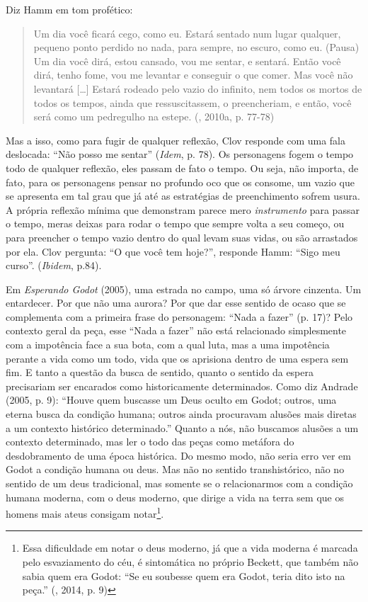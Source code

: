 {Diz Hamm em tom profético:

\begin{quote}
Um dia você ficará cego, como eu. Estará sentado num lugar qualquer,
pequeno ponto perdido no nada, para sempre, no escuro, como eu. (Pausa)
Um dia você dirá, estou cansado, vou me sentar, e sentará. Então você
dirá, tenho fome, vou me levantar e conseguir o que comer. Mas você não
levantará [\ldots{}] Estará rodeado pelo vazio do infinito, nem
todos os mortos de todos os tempos, ainda que ressuscitassem, o
preencheriam, e então, você será como um pedregulho na estepe. (,
2010a, p. 77-78)
\end{quote}

Mas a isso, como para fugir de qualquer reflexão, Clov responde com uma
fala deslocada: ``Não posso me sentar'' (\emph{Idem}, p. 78). Os
personagens fogem o tempo todo de qualquer reflexão, eles passam de fato
o tempo. Ou seja, não importa, de fato, para os personagens pensar no
profundo oco que os consome, um vazio que se apresenta em tal grau que
já até as estratégias de preenchimento sofrem usura. A própria reflexão
mínima que demonstram parece mero \emph{instrumento} para passar o
tempo, meras deixas para rodar o tempo que sempre volta a seu começo, ou
para preencher o tempo vazio dentro do qual levam suas vidas, ou são
arrastados por ela. Clov pergunta: ``O que você tem hoje?'', responde
Hamm: ``Sigo meu curso''. (\emph{Ibidem}, p.84).

Em \emph{Esperando Godot} (2005), uma estrada no campo, uma só árvore
cinzenta. Um entardecer. Por que não uma aurora? Por que dar esse
sentido de ocaso que se complementa com a primeira frase do personagem:
``Nada a fazer'' (p. 17)? Pelo contexto geral da peça, esse ``Nada a
fazer'' não está relacionado simplesmente com a impotência face a sua
bota, com a qual luta, mas a uma impotência perante a vida como um todo,
vida que os aprisiona dentro de uma espera sem fim. E tanto a questão da
busca de sentido, quanto o sentido da espera precisariam ser encarados
como historicamente determinados. Como diz Andrade (2005, p. 9): ``Houve
quem buscasse um Deus oculto em Godot; outros, uma eterna busca da
condição humana; outros ainda procuravam alusões mais diretas a um
contexto histórico determinado.'' Quanto a nós, não buscamos alusões a
um contexto determinado, mas ler o todo das peças como metáfora do
desdobramento de uma época histórica. Do mesmo modo, não seria erro ver
em Godot a condição humana ou deus. Mas não no sentido transhistórico,
não no sentido de um deus tradicional, mas somente se o relacionarmos
com a condição humana moderna, com o deus moderno, que dirige a vida na
terra sem que os homens mais ateus consigam notar\footnote{Essa
  dificuldade em notar o deus moderno, já que a vida moderna é marcada
  pelo esvaziamento do céu, é sintomática no próprio Beckett, que também
  não sabia quem era Godot: ``Se eu soubesse quem era Godot, teria dito
  isto na peça.'' (, 2014, p. 9)}.

}
